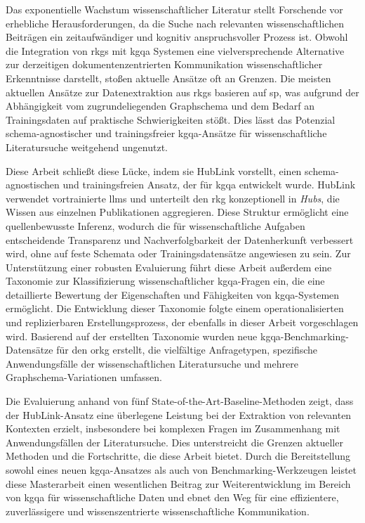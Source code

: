 
\Abstract
\glsresetall
Das exponentielle Wachstum wissenschaftlicher Literatur stellt Forschende vor erhebliche Herausforderungen, da die Suche nach relevanten wissenschaftlichen Beiträgen ein zeitaufwändiger und kognitiv anspruchsvoller Prozess ist. Obwohl die Integration von \glspl{rkg} mit \gls{kgqa} Systemen eine vielversprechende Alternative zur derzeitigen dokumentenzentrierten Kommunikation wissenschaftlicher Erkenntnisse darstellt, stoßen aktuelle Ansätze oft an Grenzen. Die meisten aktuellen Ansätze zur Datenextraktion aus \glspl{rkg} basieren auf \gls{sp}, was aufgrund der Abhängigkeit vom zugrundeliegenden Graphschema und dem Bedarf an Trainingsdaten auf praktische Schwierigkeiten stößt. Dies lässt das Potenzial schema-agnostischer und trainingsfreier \gls{kgqa}-Ansätze für wissenschaftliche Literatursuche weitgehend ungenutzt.

Diese Arbeit schließt diese Lücke, indem sie HubLink vorstellt, einen schema-agnostischen und trainingsfreien Ansatz, der für \gls{kgqa} entwickelt wurde. HubLink verwendet vortrainierte \glspl{llm} und unterteilt den \gls{rkg} konzeptionell in \emph{Hubs}, die Wissen aus einzelnen Publikationen aggregieren. Diese Struktur ermöglicht eine quellenbewusste Inferenz, wodurch die für wissenschaftliche Aufgaben entscheidende Transparenz und Nachverfolgbarkeit der Datenherkunft verbessert wird, ohne auf feste Schemata oder Trainingsdatensätze angewiesen zu sein. Zur Unterstützung einer robusten Evaluierung führt diese Arbeit außerdem eine Taxonomie zur Klassifizierung wissenschaftlicher \gls{kgqa}-Fragen ein, die eine detaillierte Bewertung der Eigenschaften und Fähigkeiten von \gls{kgqa}-Systemen ermöglicht. Die Entwicklung dieser Taxonomie folgte einem operationalisierten und replizierbaren Erstellungsprozess, der ebenfalls in dieser Arbeit vorgeschlagen wird. Basierend auf der erstellten Taxonomie wurden neue \gls{kgqa}-Benchmarking-Datensätze für den \gls{orkg} erstellt, die vielfältige Anfragetypen, spezifische Anwendungsfälle der wissenschaftlichen Literatursuche und mehrere Graphschema-Variationen umfassen.

Die Evaluierung anhand von fünf State-of-the-Art-Baseline-Methoden zeigt, dass der HubLink-Ansatz eine überlegene Leistung bei der Extraktion von relevanten Kontexten erzielt, insbesondere bei komplexen Fragen im Zusammenhang mit Anwendungsfällen der Literatursuche. Dies unterstreicht die Grenzen aktueller Methoden und die Fortschritte, die diese Arbeit bietet. Durch die Bereitstellung sowohl eines neuen \gls{kgqa}-Ansatzes als auch von Benchmarking-Werkzeugen leistet diese Masterarbeit einen wesentlichen Beitrag zur Weiterentwicklung im Bereich von \gls{kgqa} für wissenschaftliche Daten und ebnet den Weg für eine effizientere, zuverlässigere und wissenszentrierte wissenschaftliche Kommunikation.